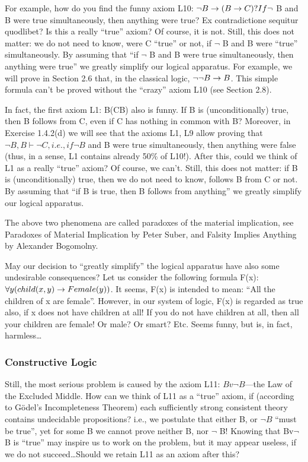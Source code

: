 For example, how do you find the funny axiom L10: \(\neg B\rightarrow (B\rightarrow C)? If \neg\) B and B were true simultaneously, then anything were true? Ex contradictione sequitur quodlibet? Is this a really ``true'' axiom? Of course, it is not. Still, this does not matter: we do not need to know, were C ``true'' or not, if \(\neg\) B and B were ``true'' simultaneously. By assuming that ``if \(\neg\) B and B were true simultaneously, then anything were true'' we greatly simplify our logical apparatus. For example, we will prove in Section 2.6 that, in the classical logic, \(\neg \neg B\rightarrow B\). This simple formula can't be proved without the ``crazy'' axiom L10 (see Section 2.8).

In fact, the first axiom L1: B\IMPLIES (C\IMPLIES B) also is funny. If B is (unconditionally) true, then B follows from C, even if C has nothing in common with B? Moreover, in Exercise 1.4.2(d) we will see that the axioms L1, L9 allow proving that \(\neg B, B \vdash \neg C, i.e., if \neg B\) and B were true simultaneously, then anything were false (thus, in a sense, L1 contains already 50\% of L10!). After this, could we think of L1 as a really ``true'' axiom? Of course, we can't. Still, this does not matter: if B is (unconditionally) true, then we do not need to know, follows B from C or not. By assuming that ``if B is true, then B follows from anything'' we greatly simplify our logical apparatus.

The above two phenomena are called paradoxes of the material implication, see Paradoxes of Material Implication by Peter Suber, and Falsity Implies Anything by Alexander Bogomolny.

May our decision to ``greatly simplify'' the logical apparatus have also some undesirable consequences?  Let us consider the following formula F(x): \(\forall y(child(x, y)\rightarrow Female(y))\).  It seems, F(x) is intended to mean: ``All the children of x are female''. However, in our system of logic, F(x) is regarded as true also, if x does not have children at all! If you do not have children at all, then all your children are female! Or male? Or smart? Etc. Seems funny, but is, in fact, harmless\ldots 

\subsubsection{Constructive Logic}

Still, the most serious problem is caused by the axiom L11: \(Bv\neg B\)---the Law of the Excluded Middle.  How can we think of L11 as a ``true'' axiom, if (according to G\"{o}del's Incompleteness Theorem) each sufficiently strong consistent theory contains undecidable propositions? i.e., we postulate that either B, or \(\neg B\) ``must be true'', yet for some B we cannot prove neither B, nor \(\neg\) B! Knowing that Bv\(\neg\) B is ``true'' may inspire us to work on the problem, but it may appear useless, if we do not succeed\ldots  Should we retain L11 as an axiom after this?

